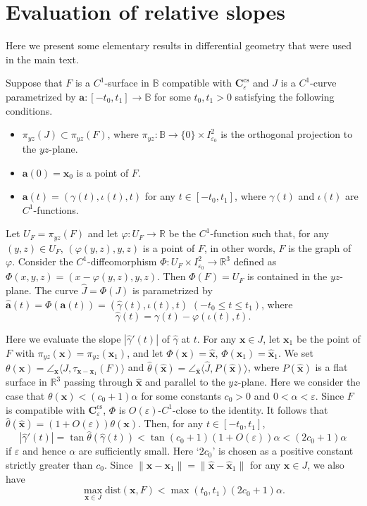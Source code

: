 \documentclass{amsart}
\theoremstyle{plain}
\theoremstyle{definition}
\numberwithin{equation}{section}
\numberwithin{figure}{section}
\def\bb{\mathbb{B}}
\def\rr{\mathbb{R}}
\def\bx{{\boldsymbol{x}}}
\def\ba{{\boldsymbol{a}}}
\def\wh{\widehat}
\def\too{\longrightarrow}
\def\vp{\varphi}
\def\ve{\varepsilon}
\def\cs{{\mathrm{cs}}}
\def\la{\langle}
\def\ra{\rangle}
\begin{document}
\appendix

\section{Evaluation of relative slopes}\label{S_relative}
Here we present some elementary results in differential geometry that were used in the main text.


Suppose that $F$ is a $C^1$-surface in $\bb$ compatible with $\boldsymbol{C}_\ve^{\cs}$ and $J$ is a $C^1$-curve parametrized by $\ba:[-t_0,t_1]\too \bb$ for some 
$t_0,t_1>0$ 
satisfying the following conditions.
\begin{itemize}
\setlength{\itemindent}{-16pt}
\item
$\pi_{yz}(J)\subset \pi_{yz}(F)$, where $\pi_{yz}:\bb\too \{0\}\times I_{\ve_0}^2$ is 
the orthogonal projection to the $yz$-plane.
\item
$\ba(0)=\bx_0$ is a point of $F$.
\item
$\ba(t)=(\gamma(t),\iota(t),t)$ for any $t\in [-t_0,t_1]$, where  
$\gamma(t)$ and $\iota(t)$ are $C^1$-functions.
\end{itemize}
Let $U_F=\pi_{yz}(F)$ and let $\vp:U_F\too \rr$ be the $C^1$-function such that, 
for any $(y,z)\in U_F$, $(\vp(y,z),y,z)$ is a point of $F$, in other words, 
$F$ is the graph of $\vp$.
Consider the $C^1$-diffeomorphism $\varPhi:U_F\times I_{\ve_0}^2\too \rr^3$ 
defined as $\varPhi(x,y,z)=(x-\vp(y,z),y,z)$.
Then $\varPhi(F)=U_F$ is contained in the $yz$-plane.
The curve $\wh J=\varPhi(J)$ is parametrized by 
$\wh \ba(t)=\varPhi(\ba(t))=(\wh\gamma(t),\iota(t),t)$ $(-t_0\leq t\leq t_1)$, 
where
\[
\wh\gamma(t)=\gamma(t)-\vp(\iota(t),t).
\]



Here we evaluate the slope $|\wh\gamma'(t)|$ of $\wh\gamma$ at $t$.
For any $\bx\in J$, let $\bx_1$ be the point of $F$ with $\pi_{yz}(\bx)=\pi_{yz}(\bx_1)$, 
and let $\varPhi(\bx)=\wh\bx$, $\varPhi(\bx_1)=\wh\bx_1$. 
We set 
$\theta(\bx)=\angle_{\bx}\la J,\tau_{\bx-\bx_1}(F)\ra$ and 
$\wh\theta(\wh\bx)=\angle_{\wh \bx}\la \wh J,P(\wh \bx)\ra$, 
where $P(\wh\bx)$ is a flat surface in $\rr^3$ passing through $\wh\bx$ and parallel to the $yz$-plane.
Here we consider the case that $\theta(\bx)<(c_0+1)\alpha$ for some constants $c_0>0$ and $0<\alpha<\ve$.
Since $F$ is compatible with $\boldsymbol{C}_\ve^{\cs}$, $\varPhi$ is $O(\ve)$-$C^1$-close to the identity.
It follows that $\wh\theta(\wh\bx)=(1+O(\ve))\theta(\bx)$.
Then, for any $t\in [-t_0,t_1]$, 
\begin{equation}\label{eqn_gammaA}
|\wh\gamma'(t)|=\tan\wh \theta(\wh\gamma(t))<\tan(c_0+1)(1+O(\ve))\alpha<(2c_0+1)\alpha
\end{equation}
if $\ve$ and hence $\alpha$ are sufficiently small.
Here `$2c_0$' is chosen as a positive constant strictly greater than $c_0$.
Since $\|\bx-\bx_1\|=\|\wh\bx-\wh\bx_1\|$ for any $\bx\in J$, we also have 
\begin{equation}\label{eqn_dist_xFA}
\max_{\bx\in J}\mathrm{dist}(\bx,F)<\max(t_0,t_1)(2c_0+1)\alpha.
\end{equation}
\end{document}
